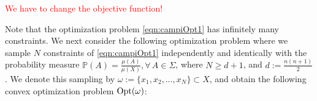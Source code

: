 %

\textcolor{red}{We have to change the objective function!}



Note that the optimization problem \eqref{eqn:campiOpt1} has infinitely many constraints. We next consider the following optimization problem where we sample $N$ constraints of \eqref{eqn:campiOpt1} independently and identically with the probability measure
$\mathbb{P}(A) = \frac{\mu(A)}{\mu(X)}, \forall\, A \in \Sigma$, where $N \geq d+1$, and $d := \frac{n(n+1)}{2}$. We denote this sampling by $\omega:=\{x_1, x_2, \ldots, x_N\} \subset X$, and obtain the following convex optimization problem $\text{Opt}(\omega)$: 

